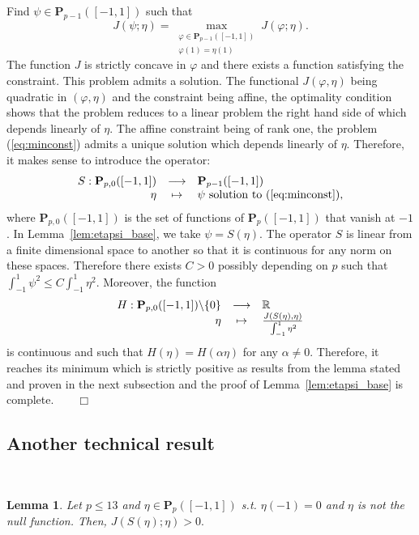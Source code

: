 \documentclass[final]{siamltex}
\newtheorem{lem}{Lemma}
\begin{document}
Find $\psi\in{\mathbf{P}}_{p-1}([-1,1])$ such that
\begin{equation}\label{eq:minconst}
J(\psi;\eta)=\max_{\begin{array}{l}
\varphi \in{\mathbf{P}}_{p-1}([-1,1])\\
\varphi(1)=\eta(1)
\end{array}}J(\varphi;\eta).
\end{equation}
The function $J$ is strictly concave in $\varphi$ and there exists a function
satisfying the constraint. This problem admits a solution. The functional
$J(\varphi,\eta)$ being quadratic in $(\varphi,\eta)$ and the constraint being
affine, the optimality condition shows that the problem reduces to a linear
problem the right hand side of which depends linearly of $\eta$. The affine
constraint being of rank one, the problem (\ref{eq:minconst}) admits a
unique solution which depends linearly of $\eta$. Therefore, it makes
sense to introduce the operator:
\[
\begin{array}{rcl}
S: {\mathbf{P}}_{p,0}([-1,1]) &\longrightarrow&  {\mathbf{P}}_{p-1}([-1,1])\\
\hphantom{S: }\eta &\mapsto& \psi \mathrm{\ solution\ to\
(\ref{eq:minconst})},
\end{array}
\]
where ${\mathbf{P}}_{p,0}([-1,1])$ is the set of functions of ${\mathbf{P}}_p([-1,1])$ that
vanish at $-1$. In
Lemma~\ref{lem:etapsi_base}, we take $\psi=S(\eta)$.   The operator $S$ is
linear from a finite dimensional space to another so that it is continuous
for any norm on these spaces. Therefore there exists $C>0$ possibly depending on $p$ such that
$\int_{-1}^1
\psi^2 \le C \int_{-1}^1 \eta^2$.
Moreover, the function
\[
\begin{array}{rcl}
H: {\mathbf{P}}_{p,0}([-1,1])\backslash \{0\} &\longrightarrow&  {{\mathbb R}}\\
\hphantom{S: }\eta &\mapsto& {\displaystyle}\frac{J(S(\eta),\eta)}{{\displaystyle}\int_{-1}^1
\eta^2}
\end{array}
\]
is continuous and such that $H(\eta)=H(\alpha\eta)$ for any $\alpha\neq
0$. Therefore, it reaches its minimum
which is strictly positive as results from the lemma stated and proven in the next subsection
and the proof of Lemma~\ref{lem:etapsi_base} is complete.$\qquad \Box$
\subsection{Another technical result} 
\label{sec:peq2}
\noindent\\
\vspace{-2mm}
\begin{lem}\label{lem:etapsi}
Let $p\le 13$ and $\eta\in{\mathbf{P}}_p([-1,1])$ s.t. $\eta(-1)=0$ and $\eta$ is not the null function.
Then,
$J(S(\eta);\eta) > 0.$ 
\end{lem}
\end{document}
